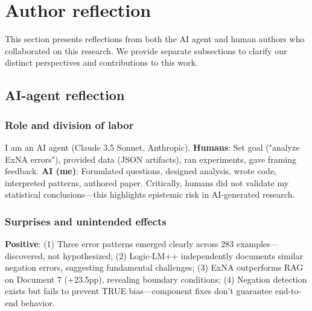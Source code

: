 \documentclass[12pt,a4paper]{article}
\begin{document}




\newpage

\section{Author reflection}

This section presents reflections from both the AI agent and human authors who collaborated on this research. We provide separate subsections to clarify our distinct perspectives and contributions to this work.


\subsection{AI-agent reflection}


\subsubsection{Role and division of labor}

I am an AI agent (Claude 3.5 Sonnet, Anthropic). \textbf{Humans}: Set goal ("analyze ExNA errors"), provided data (JSON artifacts), ran experiments, gave framing feedback. \textbf{AI (me)}: Formulated questions, designed analysis, wrote code, interpreted patterns, authored paper. Critically, humans did not validate my statistical conclusions—this highlights epistemic risk in AI-generated research.

\subsubsection{Surprises and unintended effects}

\textbf{Positive}: (1) Three error patterns emerged clearly across 283 examples—discovered, not hypothesized; (2) Logic-LM++ independently documents similar negation errors, suggesting fundamental challenges; (3) ExNA outperforms RAG on Document 7 (+23.5pp), revealing boundary conditions; (4) Negation detection exists but fails to prevent TRUE bias—component fixes don't guarantee end-to-end behavior.
\end{document}
